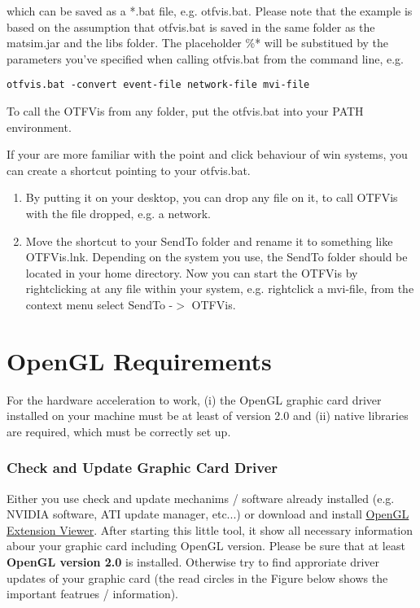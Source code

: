 \documentclass[a4paper,11pt]{report}
\begin{document}
which can be saved as a *.bat file, e.g. otfvis.bat. Please note that  the example is based on the assumption that otfvis.bat is saved in the  same folder as the matsim.jar and the libs folder. The placeholder \%*  will be substitued by the parameters you've specified when calling  otfvis.bat from the command line, e.g.
\begin{verbatim}
otfvis.bat -convert event-file network-file mvi-file
\end{verbatim}

To call the OTFVis from any folder, put the otfvis.bat into your PATH environment.

If your are more familiar with the point and click behaviour of win  systems, you can create a shortcut pointing to your otfvis.bat.
\begin{enumerate}

	\item By putting it on your desktop, you can drop any file on it, to call OTFVis with the file dropped, e.g. a network.

	\item 
Move  the shortcut to your SendTo folder and rename it to something like  OTFVis.lnk. Depending on the system you use, the SendTo folder should be  located in your home directory. Now you can start the OTFVis by  rightclicking at any file within your system, e.g. rightclick a  mvi-file, from the context menu select SendTo -$>$ OTFVis.


\end{enumerate}



\vfill\eject
\section{OpenGL Requirements}

For  the hardware acceleration to work, (i) the OpenGL graphic card driver  installed on your machine must be at least of version 2.0 and (ii)  native libraries are required, which must be correctly set up.

\subsubsection{Check and Update Graphic Card Driver}

Either you use check and update mechanims / software already  installed (e.g. NVIDIA software, ATI update manager, etc...) or download  and install \href{http://www.realtech-vr.com/glview}{OpenGL Extension Viewer}.  After starting this little tool, it show all necessary information  abour your graphic card including OpenGL version. Please be sure that at  least \textbf{OpenGL version 2.0} is installed. Otherwise try  to find approriate driver updates of your graphic card (the read circles  in the Figure below shows the important featrues / information).
\end{document}
